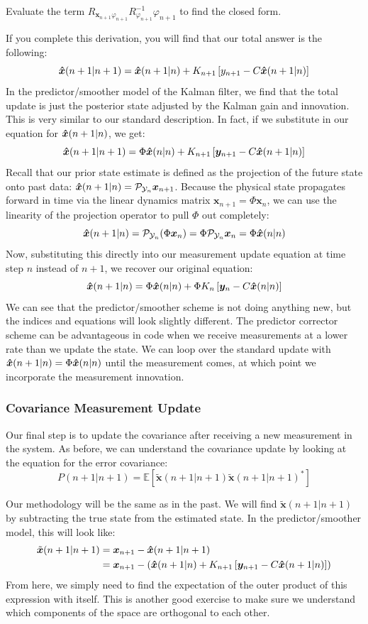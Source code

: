 \begin{exercise}
Evaluate the term $R_{\bm{x}_{n+1} \varphi_{n+1}} R_{\varphi_{n+1}}^{-1}\varphi_{n+1}$ to find the closed form.
\end{exercise}

If you complete this derivation, you will find that our total answer is the following:
$$\bm{\hat{x}}(n+1|n+1)=\bm{\hat{x}}(n+1|n)+K_{n+1}\left[y_{n+1}-C\bm{\hat{x}}(n+1|n)\right]$$
In the predictor/smoother model of the Kalman filter, we find that the total update is just the posterior state adjusted by the Kalman gain and innovation. This is very similar to our standard description. In fact, if we substitute in our equation for $\bm{\hat{x}}(n+1|n)$, we get:
$$\bm{\hat{x}}(n+1|n+1)=\Phi\bm{\hat{x}}(n|n)+K_{n+1}\left[\bm{y}_{n+1}-C\bm{\hat{x}}(n+1|n)\right]$$
Recall that our prior state estimate is defined as the projection of the future state onto past data: $\bm{\hat{x}}(n+1|n) = \mathcal{P}_{\mathcal{Y}_n}\bm{x}_{n+1}$. Because the physical state propagates forward in time via the linear dynamics matrix $\bm{x}_{n+1} = \Phi \bm{x}_n$, we can use the linearity of the projection operator to pull $\Phi$ out completely:
\begin{equation}
\bm{\hat{x}}(n+1|n) = \mathcal{P}_{\mathcal{Y}_n}(\Phi \bm{x}_n) = \Phi \mathcal{P}_{\mathcal{Y}_n}\bm{x}_n = \Phi \bm{\hat{x}}(n|n)
\end{equation}
Now, substituting this directly into our measurement update equation at time step $n$ instead of $n+1$, we recover our original equation:
$$\bm{\hat{x}}(n+1|n)=\Phi \bm{\hat{x}}(n|n)+\Phi {K}_n\left[\bm{y}_n-{C}\bm{\hat{x}}(n|n)\right]$$
We can see that the predictor/smoother scheme is not doing anything new, but the indices and equations will look slightly different. The predictor corrector scheme can be advantageous in code when we receive measurements at a lower rate than we update the state. We can loop over the standard update with $\bm{\hat{x}}(n+1|n)=\Phi\bm{\hat{x}}(n|n)$ until the measurement comes, at which point we incorporate the measurement innovation.

\subsubsection{Covariance Measurement Update}
Our final step is to update the covariance after receiving a new measurement in the system. As before, we can understand the covariance update by looking at the equation for the error covariance:
$$P(n+1|n+1)=\mathbb{E}[\bm{\tilde{x}}(n+1|n+1)\bm{\tilde{x}}(n+1|n+1)^*]$$

Our methodology will be the same as in the past. We will find $\bm{\tilde{x}}(n+1|n+1)$ by subtracting the true state from the estimated state. In the predictor/smoother model, this will look like:
\begin{align}
\tilde{\bm{x}}(n+1|n+1) &= \bm{x}_{n+1} - \bm{\hat{x}}(n+1|n+1) \\
&= \bm{x}_{n+1} - \left( \bm{\hat{x}}(n+1|n) + {K}_{n+1}\left[\bm{y}_{n+1}-{C}\bm{\hat{x}}(n+1|n)\right] \right)
\end{align}
From here, we simply need to find the expectation of the outer product of this expression with itself. This is another good exercise to make sure we understand which components of the space are orthogonal to each other.

